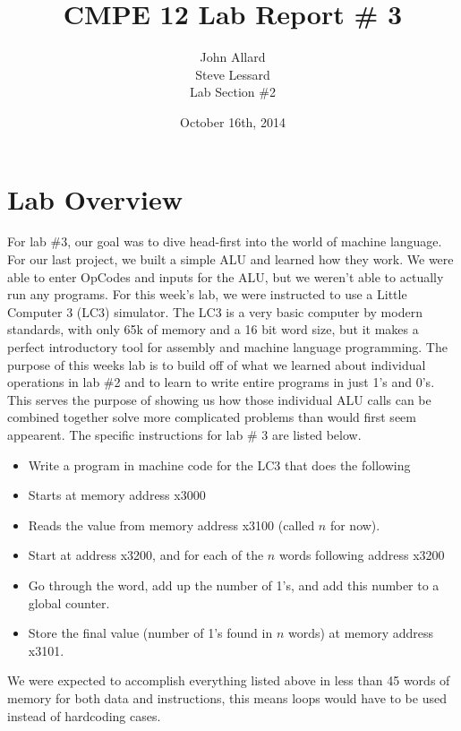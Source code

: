 \documentclass[a4paper,11pt]{article}
\title{ CMPE 12 Lab Report \# 3 \\[7 in]}
\author{John Allard \\ Steve Lessard \\ Lab Section \#2}
\date{October 16th, 2014}
\begin{document}
\maketitle
\newpage
\tableofcontents
\newpage

\section{Lab Overview}
For lab \#3, our goal was to dive head-first into the world of machine language. For our last project, we built a simple ALU and learned how they work. We were able to enter OpCodes and inputs for the ALU, but we weren't able to actually run any programs. For this week's lab, we were instructed to use a Little Computer 3 (LC3) simulator. The LC3 is a very basic computer by modern standards, with only 65k of memory and a 16 bit word size, but it makes a perfect introductory tool for assembly and machine language programming. The purpose of this weeks lab is to build off of what we learned about individual operations in lab \#2 and to learn to write entire programs in just 1's and 0's. This serves the purpose of showing us how those individual ALU calls can be combined together solve more complicated problems than would first seem appearent. The specific instructions for lab \# 3 are listed below.
\begin{itemize}
\item Write a program in machine code for the LC3 that does the following
\item Starts at memory address x3000
\item Reads the value from memory address x3100 (called $n$ for now).
\item Start at address x3200, and for each of the $n$ words following address x3200
\item Go through the word, add up the number of 1's, and add this number to a global counter.
\item Store the final value (number of 1's found in $n$ words) at memory address x3101.
\end{itemize} 

We were expected to accomplish everything listed above in less than 45 words of memory for both data and instructions, this means loops would have to be used instead of hardcoding cases. 
\end{document}
